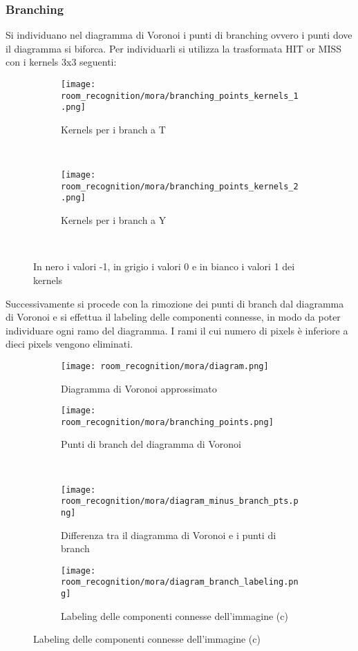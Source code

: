 \subsubsection{Branching}
Si individuano nel diagramma di Voronoi i punti di branching ovvero i punti dove il diagramma si biforca. Per individuarli si utilizza la trasformata HIT or MISS con i kernels 3x3 seguenti:
\begin{figure}[H]
  \centering
  \begin{subfigure}[t]{\textwidth}
    \centering
    \texttt{[image: room\_recognition/mora/branching\_points\_kernels\_1.png]}
    \caption{Kernels per i branch a T}
  \end{subfigure}\\
  \begin{subfigure}[t]{\textwidth}
    \centering
    \texttt{[image: room\_recognition/mora/branching\_points\_kernels\_2.png]}
    \caption{Kernels per i branch a Y}
  \end{subfigure}\\
  \caption{In nero i valori -1, in grigio i valori 0 e in bianco i valori 1 dei kernels}
\end{figure}
\noindent
Successivamente si procede con la rimozione dei punti di branch dal diagramma di Voronoi e si effettua il labeling delle componenti connesse, in modo da poter individuare ogni ramo del diagramma. I rami il cui numero di pixels è inferiore a dieci pixels vengono eliminati.
\begin{figure}[H]
  \centering

  \begin{subfigure}[t]{.45\textwidth}
    \centering
    \texttt{[image: room\_recognition/mora/diagram.png]}
    \caption{Diagramma di Voronoi approssimato}
  \end{subfigure}
  \begin{subfigure}[t]{.45\textwidth}
    \centering
    \texttt{[image: room\_recognition/mora/branching\_points.png]}
    \caption{Punti di branch del diagramma di Voronoi}
  \end{subfigure}\\
  \begin{subfigure}[t]{.45\textwidth}
    \centering
    \texttt{[image: room\_recognition/mora/diagram\_minus\_branch\_pts.png]}
    \caption{Differenza tra il diagramma di Voronoi e i punti di branch}
  \end{subfigure}
  \begin{subfigure}[t]{.45\textwidth}
    \centering
    \texttt{[image: room\_recognition/mora/diagram\_branch\_labeling.png]}
    \caption{Labeling delle componenti connesse dell'immagine {(c)}}
  \end{subfigure}
\end{figure}

